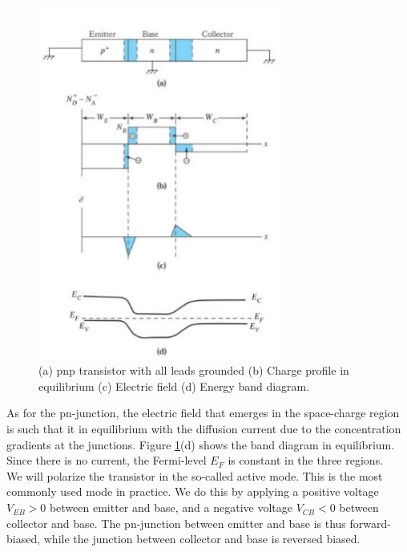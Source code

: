 \begin{figure}[h!]
\centering
\includegraphics[width=8cm]{figures/ch01/bjt2.jpg}
\caption{(a) pnp transistor with all leads grounded (b) Charge profile in equilibrium (c) Electric field (d) Energy band diagram.} 
\label{fig:bjt2}
\end{figure}
As for the pn-junction, the electric field that emerges in the space-charge region is such that it in equilibrium with the diffusion current due to the concentration gradients at the junctions. Figure \ref{fig:bjt2}(d) shows the band diagram in equilibrium. Since there is no current, the Fermi-level $E_F$ is constant in the three regions.\\
We will polarize the transistor in the so-called active mode. This is the most commonly used mode in practice. We do this by applying a positive voltage $V_{EB} > 0$ between emitter and base, and a negative voltage $V_{CB} < 0$ between collector and base. The pn-junction between emitter and base is thus forward-biased, while the junction between collector and base is reversed biased.\\
